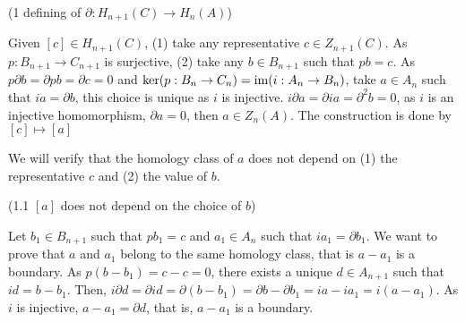 \documentclass{report}
\begin{document}
\begin{longproof}
    (1 defining of $\partial: H_{n+1}(C) \to H_n(A)$)

\begin{center}
\end{center}

    Given $[c] \in H_{n+1}(C)$, (1) take any representative $c \in Z_{n+1}(C)$. As $p: B_{n+1} \to C_{n+1}$ is surjective, (2) take any $b \in B_{n+1}$ such that $pb = c$. As $p \partial b = \partial pb = \partial c = 0$ and $\ker (p: B_n \to C_n) = \operatorname{im} (i: A_n \to B_n)$, take $a \in A_n$ such that $ia = \partial b$, this choice is unique as $i$ is injective. $i \partial a = \partial i a = \partial^2 b = 0$, as $i$ is an injective homomorphism, $\partial a = 0$, then $a \in Z_n(A)$. The construction is done by $[c] \mapsto [a]$

    We will verify that the homology class of $a$ does not depend on (1) the representative $c$ and (2) the value of $b$.

    (1.1 $[a]$ does not depend on the choice of $b$)

\begin{center}
\end{center}
    Let $b_1 \in B_{n+1}$ such that $pb_1 = c$ and $a_1 \in A_n$ such that $ia_1 = \partial b_1$. We want to prove that $a$ and $a_1$ belong to the same homology class, that is $a - a_1$ is a boundary. As $p(b - b_1) = c - c = 0$, there exists a unique $d \in A_{n+1}$ such that $id = b - b_1$. Then, $i \partial d = \partial id = \partial (b - b_1) = \partial b - \partial b_1 = ia - ia_1 = i(a - a_1)$. As $i$ is injective, $a - a_1 = \partial d$, that is, $a - a_1$ is a boundary.


\end{longproof}
\end{document}
